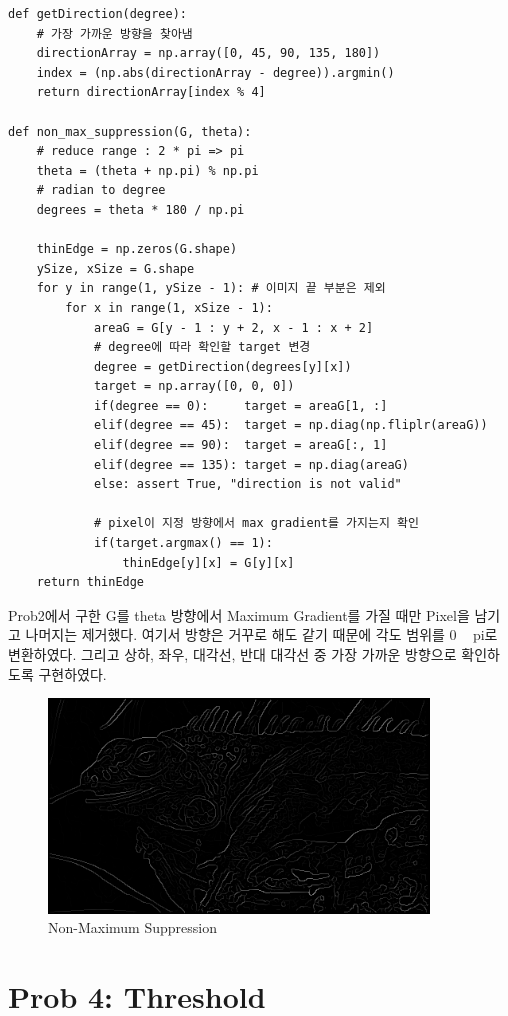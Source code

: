 \documentclass[]{report}
\begin{document}
\begin{lstlisting}
def getDirection(degree):
	# 가장 가까운 방향을 찾아냄
	directionArray = np.array([0, 45, 90, 135, 180])
	index = (np.abs(directionArray - degree)).argmin()
	return directionArray[index % 4]

def non_max_suppression(G, theta):
	# reduce range : 2 * pi => pi
	theta = (theta + np.pi) % np.pi
	# radian to degree
	degrees = theta * 180 / np.pi

	thinEdge = np.zeros(G.shape)
	ySize, xSize = G.shape
	for y in range(1, ySize - 1): # 이미지 끝 부분은 제외
		for x in range(1, xSize - 1):
			areaG = G[y - 1 : y + 2, x - 1 : x + 2]
			# degree에 따라 확인할 target 변경
			degree = getDirection(degrees[y][x])
			target = np.array([0, 0, 0])
			if(degree == 0):     target = areaG[1, :]
			elif(degree == 45):  target = np.diag(np.fliplr(areaG))
			elif(degree == 90):  target = areaG[:, 1]
			elif(degree == 135): target = np.diag(areaG)
			else: assert True, "direction is not valid"
	
			# pixel이 지정 방향에서 max gradient를 가지는지 확인
			if(target.argmax() == 1):
				thinEdge[y][x] = G[y][x]
	return thinEdge
\end{lstlisting}

Prob2에서 구한 G를 theta 방향에서 Maximum Gradient를 가질 때만 Pixel을 남기고 나머지는 제거했다. 여기서 방향은 거꾸로 해도 같기 때문에 각도 범위를 0 ~ pi로 변환하였다. 그리고 상하, 좌우, 대각선, 반대 대각선 중 가장 가까운 방향으로 확인하도록 구현하였다. \\

\begin{figure}[ht!]
	\centering
	\includegraphics[width=0.9\textwidth]{image/problem3.png}
	\caption{Non-Maximum Suppression}
	\label{problem3}
\end{figure}

\section*{Prob 4: Threshold}
\end{document}
